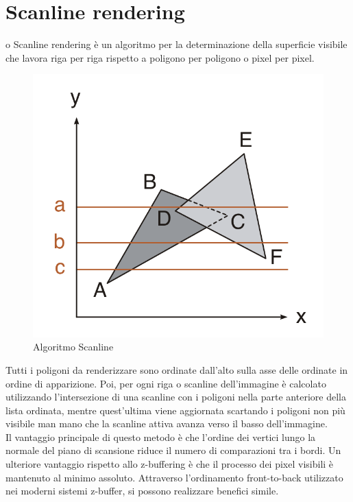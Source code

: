 \documentclass[9pt,a4paper,twoside]{tau}
\begin{document}
\section{Scanline rendering}
o Scanline rendering è un algoritmo per la determinazione della superficie visibile che lavora riga per riga rispetto a poligono per poligono o pixel per pixel.
\begin{figure}[H]
    \centering
    \includegraphics[width=0.7\columnwidth]{Figures/09.png}
    \caption{Algoritmo Scanline}
    \label{fig:figure}
\end{figure}
Tutti i poligoni da renderizzare sono ordinate dall'alto sulla asse delle ordinate in ordine di apparizione. Poi, per ogni riga o scanline dell'immagine è calcolato utilizzando l'intersezione di una scanline con i poligoni nella parte anteriore della lista ordinata, mentre quest'ultima viene aggiornata scartando i poligoni non più visibile man mano che la scanline attiva avanza verso il basso dell'immagine.\\
Il vantaggio principale di questo metodo è che l'ordine dei vertici lungo la normale del piano di scansione riduce il numero di comparazioni tra i bordi. Un ulteriore vantaggio rispetto allo z-buffering è che il processo dei pixel visibili è mantenuto al minimo assoluto. Attraverso l'ordinamento front-to-back utilizzato nei moderni sistemi z-buffer, si possono realizzare benefici simile. 
\end{document}
